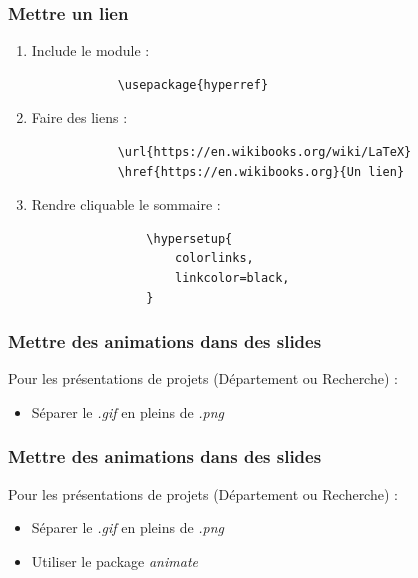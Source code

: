 \documentclass[handout]{beamer}
\begin{document}
\begin{frame}[fragile=singleslide]
	\frametitle{Mettre un lien}

	\begin{enumerate}
		\item Include le module :\\
			\begin{verbatim}
			\usepackage{hyperref}
			\end{verbatim}
		\item Faire des liens :\\
			\begin{verbatim}
			\url{https://en.wikibooks.org/wiki/LaTeX}
			\href{https://en.wikibooks.org}{Un lien}
			\end{verbatim}
		\item Rendre cliquable le sommaire :\\
			\begin{verbatim}
				\hypersetup{
    				colorlinks,
    				linkcolor=black,
				}
			\end{verbatim}
	\end{enumerate}
\end{frame}

\begin{frame}
	\frametitle{Mettre des animations dans des slides}
	\centering
	Pour les présentations de projets (Département ou Recherche) :\\
	\begin{itemize}
		\item Séparer le \textit{.gif} en pleins de \textit{.png}
	\end{itemize}
\end{frame}

\begin{frame}
	\frametitle{Mettre des animations dans des slides}
	\centering
	Pour les présentations de projets (Département ou Recherche) :\\
	\begin{itemize}
		\item Séparer le \textit{.gif} en pleins de \textit{.png}
		\item Utiliser le package \textit{animate}
	\end{itemize}
\end{frame}
\end{document}
